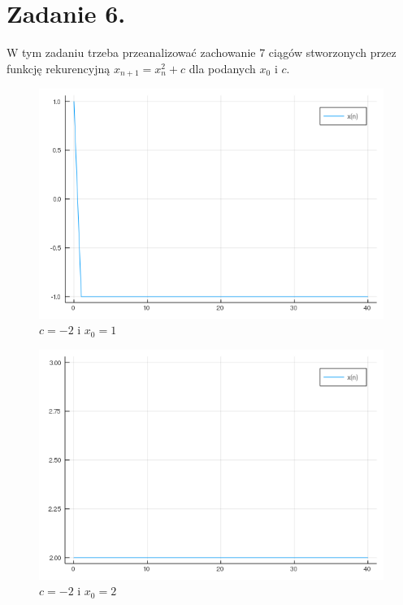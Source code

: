 \documentclass{article}
\begin{document}
\section{Zadanie 6.}
W tym zadaniu trzeba przeanalizować zachowanie 7 ciągów stworzonych przez funkcję rekurencyjną $x_{n+1}=x_{n}^{2}+c$ dla podanych $x_{0}$ i $c$.
\begin{figure}[H]
	\includegraphics[width=\linewidth]{zad6_1.png}
	\caption{$c=-2$ i $x_{0}=1$}
	\label{fig:z61}
\end{figure}
\begin{figure}[H]
	\includegraphics[width=\linewidth]{zad6_2.png}
	\caption{$c=-2$ i $x_{0}=2$}
	\label{fig:z62}
\end{figure}
\end{document}
